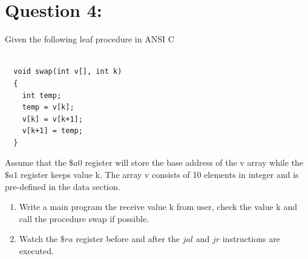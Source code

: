 \documentclass[12pt,a4paper]{article}
\begin{document}
\section*{Question 4:}
Given the following leaf procedure in ANSI C
\begin{mdframed}[hidealllines=true,backgroundcolor=magenta!10]
  \begin{lstlisting}

  void swap(int v[], int k)
  {
    int temp;
    temp = v[k];
    v[k] = v[k+1];
    v[k+1] = temp;
  }

  \end{lstlisting}
\end{mdframed}
Assume that the \(\$a0\) register will store the base address of the v array while the \(\$a1\) register keeps value k.
The array v consists of 10 elements in integer and is pre-defined in the data section.
\begin{enumerate}
  \item Write a main program the receive value k from user, check the value k and call the procedure swap if possible.
  \item Watch the \(\$ra\) register before and after the \(jal\) and \(jr\) instructions are executed.
\end{enumerate}
\end{document}
